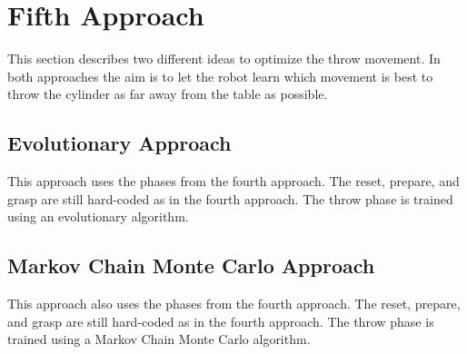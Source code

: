 \documentclass[10pt,twocolumn,letterpaper]{article}
\begin{document}
\section{Fifth Approach} \label{sec:fifthApproach}

This section describes two different ideas to optimize the throw movement. In both approaches the aim is to let the robot learn which movement is best to throw the cylinder as far away from the table as possible.

\subsection{Evolutionary Approach} \label{subsec:EA}

This approach uses the phases from the fourth approach. The reset, prepare, and grasp are still hard-coded as in the fourth approach. The throw phase is trained using an evolutionary algorithm. 

\subsection{Markov Chain Monte Carlo Approach} \label{subsec:MCMC}

This approach also uses the phases from the fourth approach. The reset, prepare, and grasp are still hard-coded as in the fourth approach. The throw phase is trained using a Markov Chain Monte Carlo algorithm. 

{\small


}
\end{document}
